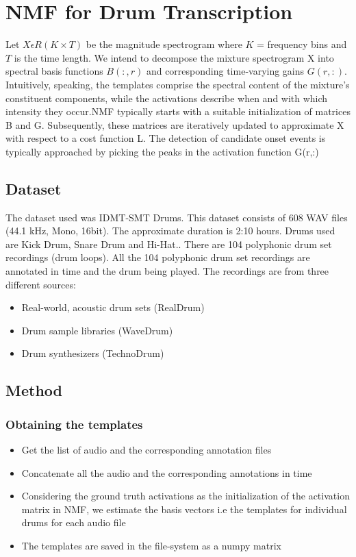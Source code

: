 \chapter{NMF for Drum Transcription}

Let $X \epsilon R(K \times T)$ be the magnitude spectrogram where $K$ = frequency bins and $T$ is the time length. We intend to decompose the mixture spectrogram X into spectral basis functions $B(:, r)$ and corresponding time-varying gains $G(r, :)$. Intuitively, speaking, the templates comprise the spectral content of the mixture’s constituent components, while the activations describe when and with which intensity they occur.NMF typically starts with a suitable initialization of matrices B and G. Subsequently, these matrices are iteratively updated to approximate X with respect to a cost function L. The detection of candidate onset events is typically approached by picking the peaks in the activation function G(r,:)
 

\section*{Dataset}
The dataset used was IDMT-SMT Drums. This dataset consists of 608 WAV files (44.1 kHz, Mono, 16bit). The approximate duration is 2:10 hours. Drums used are Kick Drum, Snare Drum and Hi-Hat.. There are 104 polyphonic drum set recordings (drum loops). All the 104 polyphonic drum set recordings are annotated in time and the drum being played. 
The recordings are from three different sources:
\begin{itemize}
\item Real-world, acoustic drum sets (RealDrum) 
\item Drum sample libraries (WaveDrum)
\item Drum synthesizers (TechnoDrum)
\end{itemize}

\section*{Method} 

\subsection*{Obtaining the templates}
\begin{itemize}

\item Get the list of audio and the corresponding annotation files
\item Concatenate all the audio and the corresponding annotations in time
\item Considering the ground truth activations as the initialization of the
activation matrix in NMF, we estimate the basis vectors i.e the
templates for individual drums for each audio file
\item The templates are saved in the file-system as a numpy matrix
\end{itemize}

